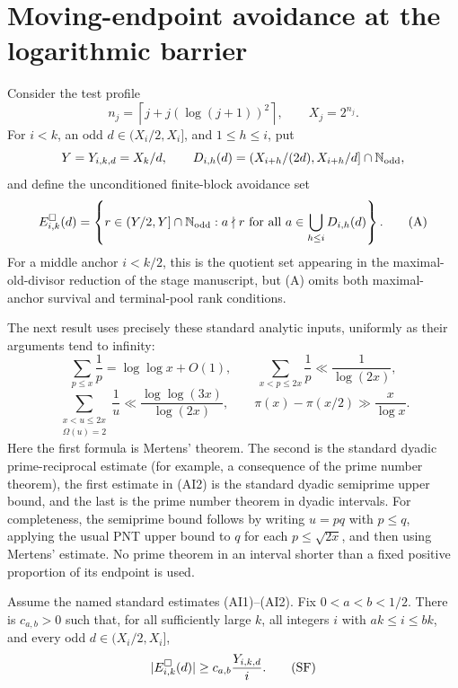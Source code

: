 \section{Moving-endpoint avoidance at the logarithmic barrier}

Consider the test profile
\[
 n_j=\left\lceil j+j(\log(j+1))^2\right\rceil,
 \qquad X_j=2^{n_j}.
\]
For $i<k$, an odd $d\in(X_i/2,X_i]$, and $1\leq h\leq i$, put
\[
 Y=Y_{i,k,d}=X_k/d,
 \qquad
 D_{i,h}(d)=\left(X_{i+h}/(2d),X_{i+h}/d\right]
                 \cap\mathbb N_{\rm odd},
\]
and define the unconditioned finite-block avoidance set
\[
 E^\square_{i,k}(d)=
 \left\{r\in(Y/2,Y]\cap\mathbb N_{\rm odd}:
 a\nmid r\ \text{for all }a\in\bigcup_{h\leq i}D_{i,h}(d)\right\}.
 \tag{A}
\]
For a middle anchor $i<k/2$, this is the quotient set appearing in the
maximal-old-divisor reduction of the stage manuscript, but (A) omits both
maximal-anchor survival and terminal-pool rank conditions.

The next result uses precisely these standard analytic inputs, uniformly as
their arguments tend to infinity:
\[
 \sum_{p\leq x}\frac1p=\log\log x+O(1),\qquad
 \sum_{x<p\leq2x}\frac1p\ll\frac1{\log(2x)},
 \tag{AI1}
\]
\[
 \sum_{\substack{x<u\leq2x\\\Omega(u)=2}}\frac1u
 \ll\frac{\log\log(3x)}{\log(2x)},
 \qquad
 \pi(x)-\pi(x/2)\gg\frac{x}{\log x}.
 \tag{AI2}
\]
Here the first formula is Mertens' theorem.  The second is the standard
dyadic prime-reciprocal estimate (for example, a consequence of the prime
number theorem), the first estimate in (AI2) is the standard dyadic
semiprime upper bound, and the last is the prime number theorem in dyadic
intervals.  For completeness, the semiprime bound follows by writing
$u=pq$ with $p\leq q$, applying the usual PNT upper bound to $q$ for each
$p\leq\sqrt{2x}$, and then using Mertens' estimate.  No prime theorem in an
interval shorter than a fixed positive proportion of its endpoint is used.

\begin{proposition}
\label{prop:semiprime-floor}
Assume the named standard estimates (AI1)--(AI2).  Fix $0<a<b<1/2$.
There is $c_{a,b}>0$ such that, for all sufficiently
large $k$, all integers $i$ with $ak\leq i\leq bk$, and every odd
$d\in(X_i/2,X_i]$,
\[
  \lvert E^\square_{i,k}(d)\rvert\geq c_{a,b}\frac{Y_{i,k,d}}i.
  \tag{SF}
\]
\end{proposition}

